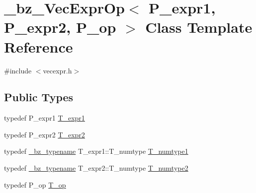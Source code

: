 \hypertarget{class__bz__VecExprOp}{}\section{\+\_\+bz\+\_\+\+Vec\+Expr\+Op$<$ P\+\_\+expr1, P\+\_\+expr2, P\+\_\+op $>$ Class Template Reference}
\label{class__bz__VecExprOp}


{\ttfamily \#include $<$vecexpr.\+h$>$}

\subsection*{Public Types}
\begin{DoxyCompactItemize}
\item 
typedef P\+\_\+expr1 \hyperlink{class__bz__VecExprOp_a9607226603810860fe37bed664ea50b3}{T\+\_\+expr1}
\item 
typedef P\+\_\+expr2 \hyperlink{class__bz__VecExprOp_ad69392f01f10ddeab59e0aece0e942ff}{T\+\_\+expr2}
\item 
typedef \hyperlink{compiler_8h_a1bc40add3e72effc9cf69dbe445cbdfd}{\+\_\+bz\+\_\+typename} T\+\_\+expr1\+::\+T\+\_\+numtype \hyperlink{class__bz__VecExprOp_a5d79220111e0ccb5eba1a38fe56a84da}{T\+\_\+numtype1}
\item 
typedef \hyperlink{compiler_8h_a1bc40add3e72effc9cf69dbe445cbdfd}{\+\_\+bz\+\_\+typename} T\+\_\+expr2\+::\+T\+\_\+numtype \hyperlink{class__bz__VecExprOp_a0fb2e4b1c56e90377f43ace8fff224a0}{T\+\_\+numtype2}
\item 
typedef P\+\_\+op \hyperlink{class__bz__VecExprOp_a4572f9d8785fd1eb23fd26b46922515d}{T\+\_\+op}
\end{DoxyCompactItemize}
